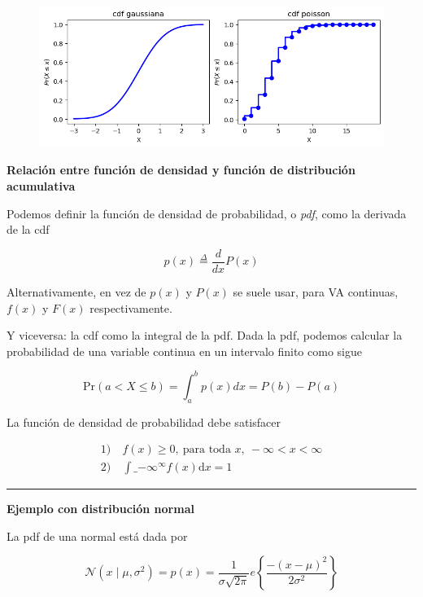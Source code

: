 \documentclass[
  letterpaper,
  DIV=11,
  numbers=noendperiod]{scrartcl}
\begin{document}
\begin{figure}[H]

{\centering \includegraphics{2.1_funciones_distribucion_densidad_files/figure-pdf/cell-10-output-1.png}

}

\end{figure}

\textbf{Relación entre función de densidad y función de distribución
acumulativa}

Podemos definir la función de densidad de probabilidad, o \emph{pdf},
como la derivada de la cdf

\[
  p(x) \overset{\Delta}{=} \frac{d}{dx}P(x)
\]

Alternativamente, en vez de \(p(x)\) y \(P(x)\) se suele usar, para VA
continuas, \(f(x)\) y \(F(x)\) respectivamente.

Y viceversa: la cdf como la integral de la pdf. Dada la pdf, podemos
calcular la probabilidad de una variable continua en un intervalo finito
como sigue

\[
  \text{Pr}(a <X\leq b) = \int_a^b p(x)dx = P(b) - P(a) \tag{10}
\]

La función de densidad de probabilidad debe satisfacer

\begin{align*}
1)\ &f(x) \geq 0,\ \text{para toda } x,\ -\infty < x < \infty\\
2)\ &\int\_{-\infty}^\infty f(x)\text{d}x = 1
\end{align*}

\begin{center}\rule{0.5\linewidth}{0.5pt}\end{center}

\textbf{Ejemplo con distribución normal}

La pdf de una normal está dada por

\[
  \mathcal{N}(x\mid \mu, \sigma^2)=  p(x) = \frac{1}{\sigma \sqrt{2\pi}} e\left\{\frac{-(x-\mu)^2}{2\sigma^2}\right\} \tag{10}
\]
\end{document}

